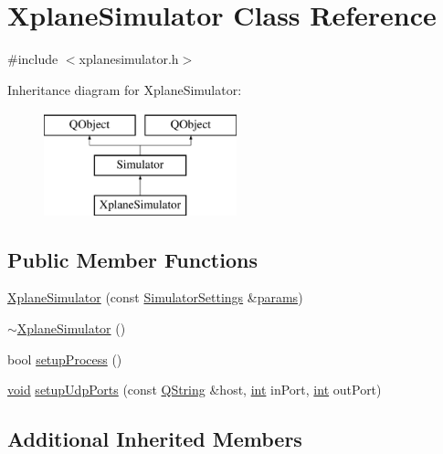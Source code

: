\hypertarget{class_xplane_simulator}{\section{Xplane\-Simulator Class Reference}
\label{class_xplane_simulator}
}


{\ttfamily \#include $<$xplanesimulator.\-h$>$}

Inheritance diagram for Xplane\-Simulator\-:\begin{figure}[H]
\begin{center}
\leavevmode
\includegraphics[height=3.000000cm]{class_xplane_simulator}
\end{center}
\end{figure}
\subsection*{Public Member Functions}
\begin{DoxyCompactItemize}
\item 
\hyperlink{group__hitlplugin_ga5832264c593dd9f80ac14145b83c28c9}{Xplane\-Simulator} (const \hyperlink{group___h_i_t_l_plugin_ga052199f1328d3002bce3e45345aa7f4e}{Simulator\-Settings} \&\hyperlink{glext_8h_afeb6390ab3bc8a0e96a88aff34d52288}{params})
\item 
\hyperlink{group__hitlplugin_ga0254db12886ca7e399e2d27fef9e185a}{$\sim$\-Xplane\-Simulator} ()
\item 
bool \hyperlink{group__hitlplugin_ga3818193fd63bfaf004e3aab25491f28c}{setup\-Process} ()
\item 
\hyperlink{group___u_a_v_objects_plugin_ga444cf2ff3f0ecbe028adce838d373f5c}{void} \hyperlink{group__hitlplugin_ga84ae33286060d1b0d834fa2b5f20e2fe}{setup\-Udp\-Ports} (const \hyperlink{group___u_a_v_objects_plugin_gab9d252f49c333c94a72f97ce3105a32d}{Q\-String} \&host, \hyperlink{ioapi_8h_a787fa3cf048117ba7123753c1e74fcd6}{int} in\-Port, \hyperlink{ioapi_8h_a787fa3cf048117ba7123753c1e74fcd6}{int} out\-Port)
\end{DoxyCompactItemize}
\subsection*{Additional Inherited Members}


